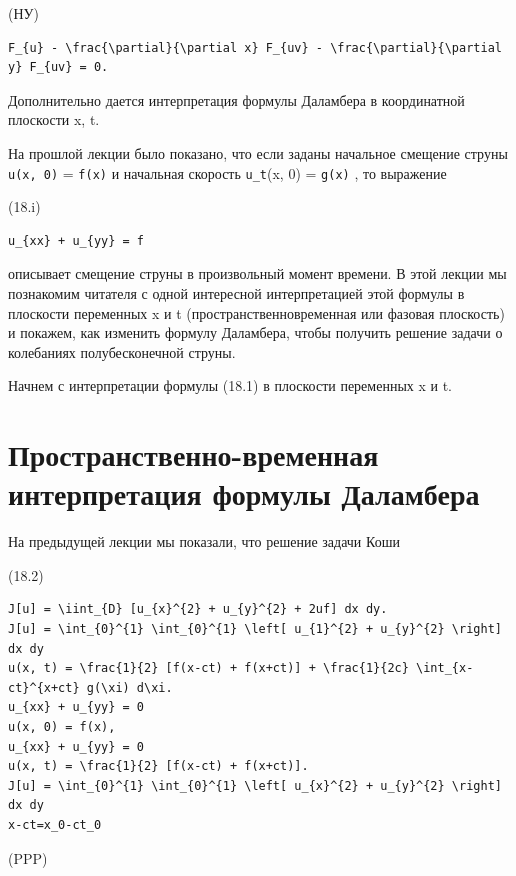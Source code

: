 \documentclass[
  ukrainian,
]{article}
\begin{document}
(НУ)

\begin{verbatim}
F_{u} - \frac{\partial}{\partial x} F_{uv} - \frac{\partial}{\partial y} F_{uv} = 0.
\end{verbatim}

Дополнительно дается интерпретация формулы Даламбера в координатной
плоскости x, t.

На прошлой лекции было показано, что если заданы начальное смещение
струны \texttt{u(x,\ 0)} = \texttt{f(x)} и начальная скорость
\texttt{u\_t}(x, 0) = \texttt{g(x)} , то выражение

(18.i)

\begin{verbatim}
u_{xx} + u_{yy} = f
\end{verbatim}

описывает смещение струны в произвольный момент времени. В этой лекции
мы познакомим читателя с одной интересной интерпретацией этой формулы в
плоскости переменных x и t (пространственновременная или фазовая
плоскость) и покажем, как изменить формулу Даламбера, чтобы получить
решение задачи о колебаниях полубесконечной струны.

Начнем с интерпретации формулы (18.1) в плоскости переменных x и t.

\section{Пространственно-временная интерпретация формулы
Даламбера}\label{ux43fux440ux43eux441ux442ux440ux430ux43dux441ux442ux432ux435ux43dux43dux43e-ux432ux440ux435ux43cux435ux43dux43dux430ux44f-ux438ux43dux442ux435ux440ux43fux440ux435ux442ux430ux446ux438ux44f-ux444ux43eux440ux43cux443ux43bux44b-ux434ux430ux43bux430ux43cux431ux435ux440ux430}

На предыдущей лекции мы показали, что решение задачи Коши

(18.2)

\begin{verbatim}
J[u] = \iint_{D} [u_{x}^{2} + u_{y}^{2} + 2uf] dx dy.
J[u] = \int_{0}^{1} \int_{0}^{1} \left[ u_{1}^{2} + u_{y}^{2} \right] dx dy
u(x, t) = \frac{1}{2} [f(x-ct) + f(x+ct)] + \frac{1}{2c} \int_{x-ct}^{x+ct} g(\xi) d\xi.
u_{xx} + u_{yy} = 0
u(x, 0) = f(x),
u_{xx} + u_{yy} = 0
u(x, t) = \frac{1}{2} [f(x-ct) + f(x+ct)].
J[u] = \int_{0}^{1} \int_{0}^{1} \left[ u_{x}^{2} + u_{y}^{2} \right] dx dy
x-ct=x_0-ct_0
\end{verbatim}

(PPP)
\end{document}
